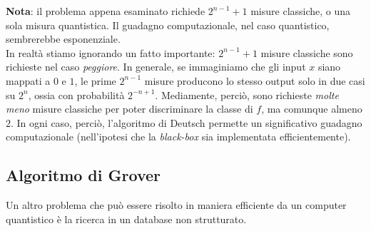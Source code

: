 \documentclass[../../InformazioneQuantistica.tex]{subfiles}
\begin{document}
\textbf{Nota}: il problema appena esaminato richiede $2^{n-1}+1$ misure classiche, o una sola misura quantistica. Il guadagno computazionale, nel caso quantistico, sembrerebbe esponenziale.\\
In realtà stiamo ignorando un fatto importante: $2^{n-1}+1$ misure classiche sono richieste nel caso \textit{peggiore}. In generale, se immaginiamo che gli input $x$ siano mappati  a $0$ e $1$, le prime $2^{n-1}$ misure producono lo stesso output solo in due casi su $2^n$, ossia con probabilità $2^{-n+1}$. Mediamente, perciò, sono richieste \textit{molte meno} misure classiche per poter discriminare la classe di $f$, ma comunque almeno $2$. In ogni caso, perciò, l'algoritmo di Deutsch permette un significativo guadagno computazionale (nell'ipotesi che la \textit{black-box} sia implementata efficientemente).

\subsection{Algoritmo di Grover}
Un altro problema che può essere risolto in maniera efficiente da un computer quantistico è la ricerca in un database non strutturato.\\
\end{document}
